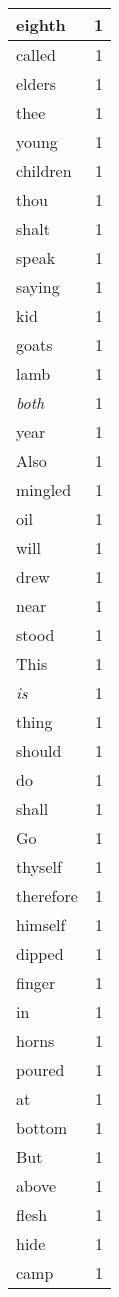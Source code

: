\begin{center}
\begin{longtable}{l|r}
eighth & 1 \\ \hline
called & 1 \\ \hline
elders & 1 \\ \hline
thee & 1 \\ \hline
young & 1 \\ \hline
children & 1 \\ \hline
thou & 1 \\ \hline
shalt & 1 \\ \hline
speak & 1 \\ \hline
saying & 1 \\ \hline
kid & 1 \\ \hline
goats & 1 \\ \hline
lamb & 1 \\ \hline
\emph{both} & 1 \\ \hline
year & 1 \\ \hline
Also & 1 \\ \hline
mingled & 1 \\ \hline
oil & 1 \\ \hline
will & 1 \\ \hline
drew & 1 \\ \hline
near & 1 \\ \hline
stood & 1 \\ \hline
This & 1 \\ \hline
\emph{is} & 1 \\ \hline
thing & 1 \\ \hline
should & 1 \\ \hline
do & 1 \\ \hline
shall & 1 \\ \hline
Go & 1 \\ \hline
thyself & 1 \\ \hline
therefore & 1 \\ \hline
himself & 1 \\ \hline
dipped & 1 \\ \hline
finger & 1 \\ \hline
in & 1 \\ \hline
horns & 1 \\ \hline
poured & 1 \\ \hline
at & 1 \\ \hline
bottom & 1 \\ \hline
But & 1 \\ \hline
above & 1 \\ \hline
flesh & 1 \\ \hline
hide & 1 \\ \hline
camp & 1 \\ \hline

\end{longtable}
\end{center}
